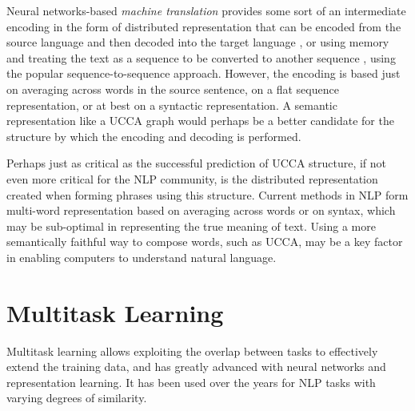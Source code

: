 \documentclass[12pt,a4paper,table]{report}
\renewcommand\cite{\citep}      %
\begin{document}
Neural networks-based \textit{machine translation} provides some sort of
an intermediate encoding in the form of distributed representation that can be
encoded from the source language and then decoded into the target
language \cite{zou2013bilingual}, or using memory and treating the text as a
sequence to be converted to another sequence \cite{sutskever2014sequence},
using the popular sequence-to-sequence approach.
However, the encoding is based just on averaging across words in the source
sentence, on a flat sequence representation, or at best on a syntactic
representation. A semantic representation like a UCCA graph would perhaps be a
better candidate for the structure by which the encoding and decoding is
performed.

  \begin{center}
  \end{center}

Perhaps just as critical as the successful prediction of UCCA structure, if not
even more critical for the NLP community, is the distributed representation
created when forming phrases using this structure. Current methods in NLP form
multi-word representation based on averaging across words or on syntax, which
may be sub-optimal in representing the true meaning of text. Using a more
semantically faithful way to compose words, such as UCCA, may be a key factor
in enabling computers to understand natural language.


\section{Multitask Learning}

Multitask learning \citep{caruana1998multitask} allows exploiting the overlap between tasks
to effectively extend the training data, 
and has greatly advanced with neural networks and representation learning.
It has been used over the years for NLP tasks with varying degrees of similarity.
\end{document}
